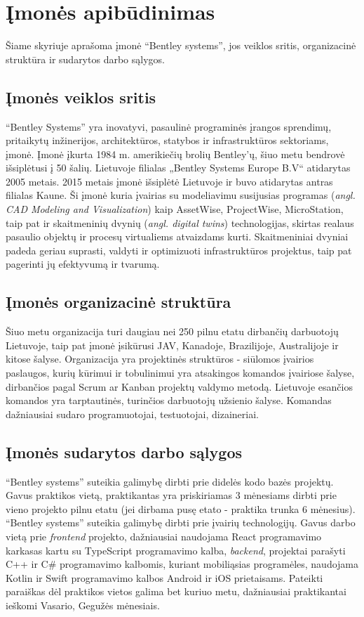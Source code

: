
\section{Įmonės apibūdinimas}
Šiame skyriuje aprašoma įmonė \enquote{Bentley systems}, jos veiklos sritis, organizacinė struktūra ir sudarytos darbo sąlygos.
\subsection{Įmonės veiklos sritis}


\enquote{Bentley Systems} yra inovatyvi, pasaulinė programinės įrangos sprendimų, pritaikytų inžinerijos, architektūros, statybos ir infrastruktūros sektoriams, įmonė. Įmonė įkurta 1984 m. amerikiečių brolių Bentley'ų, šiuo metu bendrovė išsiplėtusi į 50 šalių. Lietuvoje filialas „Bentley Systems Europe B.V“ atidarytas 2005 metais. 2015 metais įmonė išsiplėtė Lietuvoje ir buvo atidarytas antras filialas Kaune. Ši įmonė kuria įvairias su modeliavimu susijusias programas (\emph{angl. CAD Modeling and Visualization}) kaip AssetWise, ProjectWise, MicroStation, taip pat ir skaitmeninių dvynių (\emph{angl. digital twins}) technologijas, skirtas realaus pasaulio objektų ir procesų virtualiems atvaizdams kurti. Skaitmeniniai dvyniai padeda geriau suprasti, valdyti ir optimizuoti infrastruktūros projektus, taip pat pagerinti jų efektyvumą ir tvarumą.

\subsection{Įmonės organizacinė struktūra}
Šiuo metu organizacija turi daugiau nei 250 pilnu etatu dirbančių darbuotojų Lietuvoje, taip pat įmonė įsikūrusi JAV, Kanadoje, Brazilijoje, Australijoje ir kitose šalyse. Organizacija yra projektinės struktūros - siūlomos įvairios paslaugos, kurių kūrimui ir tobulinimui yra atsakingos komandos įvairiose šalyse, dirbančios pagal Scrum ar Kanban projektų valdymo metodą. Lietuvoje esančios komandos yra tarptautinės, turinčios darbuotojų užsienio šalyse. Komandas dažniausiai sudaro programuotojai, testuotojai, dizaineriai.

\subsection{Įmonės sudarytos darbo sąlygos}
\enquote{Bentley systems} suteikia galimybę dirbti prie didelės kodo bazės projektų. Gavus praktikos vietą, praktikantas yra priskiriamas 3 mėnesiams dirbti prie vieno projekto pilnu etatu (jei dirbama pusę etato - praktika trunka 6 mėnesius). \enquote{Bentley systems} suteikia galimybę dirbti prie įvairių technologijų. Gavus darbo vietą prie \textit{frontend} projekto, dažniausiai naudojama React programavimo karkasas kartu su TypeScript programavimo kalba, \textit{backend}, projektai parašyti C++ ir C\# programavimo kalbomis, kuriant mobiliąsias programėles, naudojama Kotlin ir Swift programavimo kalbos Android ir iOS prietaisams. Pateikti paraiškas dėl praktikos vietos galima bet kuriuo metu, dažniausiai praktikantai ieškomi Vasario, Gegužės mėnesiais.

